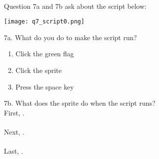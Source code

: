 \noindent \dotfill \\
Question 7a and 7b ask about the script below:
\begin{center}
\texttt{[image: q7\_script0.png]}
\end{center}

\noindent 7a. What do you do to make the script run?
\renewcommand{\theenumi}{\Alph{enumi}}
\begin{enumerate}
\item Click the green flag
\item Click the sprite
\item Press the space key \\
\end{enumerate}

\noindent 7b. What does the sprite do when the script runs? \\

\noindent First, \hrulefill . \\ \\
Next, \hrulefill . \\ \\
Last, \hrulefill . \\



